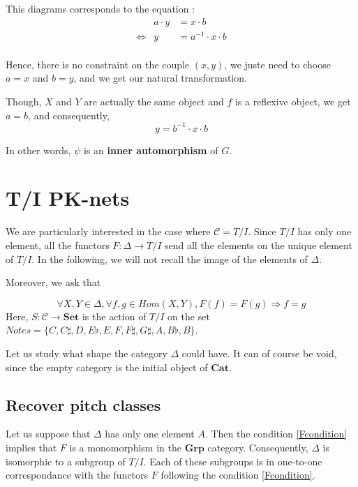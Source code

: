 \documentclass{report}
\begin{document}
This diagrams corresponds to the equation :
\begin{eqnarray*}
    &a\cdot y &= x \cdot b\\
    \Leftrightarrow & y &= a^{-1}\cdot x\cdot  b\\
\end{eqnarray*}

Hence, there is no constraint on the couple $(x,y)$, we juste need to choose $a = x$ and $b = y$, and we get our natural transformation.

Though, $X$ and $Y$ are actually the same object and $f$ is a reflexive object, we get $a = b$, and consequently,
$$y = b^{-1}\cdot x \cdot b $$

In other words, $\psi$ is an \textbf{inner automorphism} of $G$.


\section{T/I PK-nets}

We are particularly interested in the case where $\mathcal{C} = T/I$. Since $T/I$ has only one element, all the functors $F:\Delta \rightarrow T/I$ send all the elements on the unique element of $T/I$. In the following, we will not recall the image of the elements of $\Delta$.

Moreover, we ask that

\begin{equation}
    \forall X, Y\in \Delta, \forall f, g \in Hom(X,Y), F(f) = F(g) \Rightarrow f = g
    \label{Fcondition}
\end{equation}
Here, $S:\mathcal{C}\rightarrow \textbf{Set}$ is the action of $T/I$ on the set $Notes = \{C,C\sharp,D,E\flat,E,F,F\sharp,G\sharp,A,B\flat,B\}$.

Let us study what shape the category $\Delta$ could have. It can of course be void, since the empty category is the initial object of $\textbf{Cat}$.

\subsection{Recover pitch classes}
Let us suppose that $\Delta$ has only one element $A$. Then the condition  \ref{Fcondition} implies that $F$ is a monomorphism in the $\textbf{Grp}$ category. Consequently, $\Delta$ is isomorphic to a subgroup of $T/I$. Each of these subgroups is in one-to-one correspondance with the functors $F$ following the condition \ref{Fcondition}.
\end{document}

